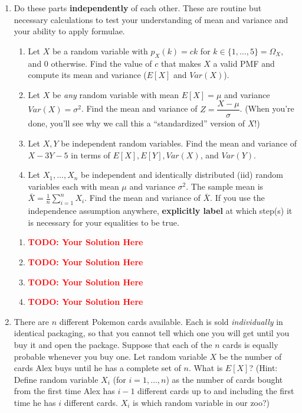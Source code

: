 \documentclass[12pt]{article}
\def\todo#1{\textcolor{red}{\textbf{#1}}}
\renewcommand{\|}{\mid}
\begin{document}
\begin{enumerate}
    \item Do these parts \textbf{independently} of each other. These are routine but necessary calculations to test your understanding of mean and variance and your ability to apply formulae.
    \begin{enumerate}
        \item Let $X$ be a random variable with $p_X(k)=ck$ for $k\in\{1,\dots,5\}=\Omega_X$, and $0$ otherwise. Find the value of $c$ that makes $X$ a valid PMF and compute its mean and variance ($E[X]$ and $Var(X)$).
        \item Let $X$ be \textit{any} random variable with mean $E[X]=\mu$ and variance $Var(X)=\sigma^2$. Find the mean and variance of $Z=\dfrac{X-\mu}{\sigma}$. (When you're done, you'll see why we call this a ``standardized'' version of $X$!)
        \item Let $X,Y$ be independent random variables. Find the mean and variance of $X-3Y-5$ in terms of $E[X],E[Y],Var(X)$, and $Var(Y)$.
        \item Let $X_1,\dots,X_n$ be independent and identically distributed (iid) random variables each with mean $\mu$ and variance $\sigma^2$. The sample mean is $\bar{X}=\frac{1}{n}\sum_{i=1}^n{X_i}$. Find the mean and variance of $\bar{X}$. If you use the independence assumption anywhere, \textbf{explicitly label} at which step(s) it is necessary for your equalities to be true.
    \end{enumerate}
    
\begin{tcolorbox}
\begin{enumerate}
\item \todo{TODO: Your Solution Here}
\item \todo{TODO: Your Solution Here}
\item \todo{TODO: Your Solution Here}
\item \todo{TODO: Your Solution Here}
\end{enumerate}
\end{tcolorbox}

\item There are $n$ different Pokemon cards available.  Each is sold
  \textit{individually} in identical packaging, so that you cannot tell which
  one you will get until you buy it and open the package.  Suppose
  that each of the $n$ cards is equally probable whenever you buy one.
  Let random variable $X$ be the number of cards Alex buys until he
  has a complete set of $n$.  What is $E[X]$?  (Hint: Define random
  variable $X_i$ (for $i=1,\dots,n$) as the number of cards bought from the first time
  Alex has $i-1$ different cards up to and including the first time he
  has $i$ different cards. $X_i$ is which random variable in our zoo?)


\end{enumerate}
\end{document}
